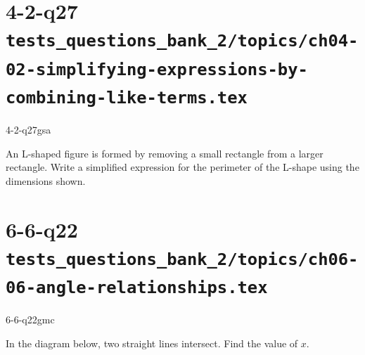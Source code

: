 \documentclass[12pt, fleqn, openany]{studyGuide}
\begin{document}
\section*{4-2-q27 \hfill \normalsize\texttt{tests\_questions\_bank\_2/topics/ch04-02-simplifying-expressions-by-combining-like-terms.tex}}
\begin{practiceQuestion}{4-2-q27}{gsa}
\begin{questionText}
An L-shaped figure is formed by removing a small rectangle from a larger rectangle. Write a simplified expression for the perimeter of the L-shape using the dimensions shown.

\begin{center}
\end{center}
\end{questionText}
\end{practiceQuestion}

\newpage
\section*{6-6-q22 \hfill \normalsize\texttt{tests\_questions\_bank\_2/topics/ch06-06-angle-relationships.tex}}
\begin{practiceQuestion}{6-6-q22}{gmc}
\begin{questionText}
In the diagram below, two straight lines intersect. Find the value of $x$.

\begin{center}
\end{center}
\end{questionText}
\end{practiceQuestion}
\end{document}
